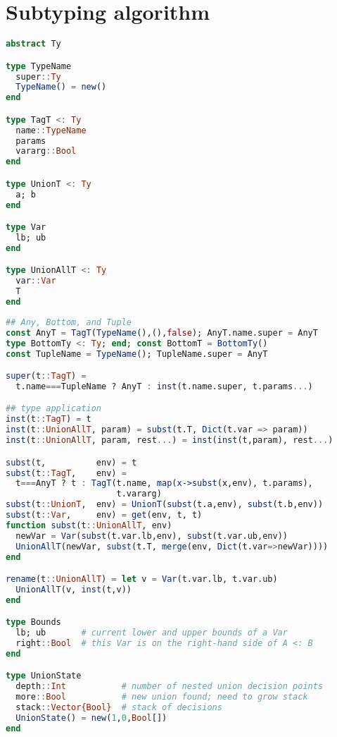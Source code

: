 \chapter{Subtyping algorithm}
\label{appendix:subtyping}

\begin{singlespace}
\begin{multicols}{2}
\begin{lstlisting}[language=julia]
abstract Ty

type TypeName
  super::Ty
  TypeName() = new()
end

type TagT <: Ty
  name::TypeName
  params
  vararg::Bool
end

type UnionT <: Ty
  a; b
end

type Var
  lb; ub
end

type UnionAllT <: Ty
  var::Var
  T
end
\end{lstlisting}
\end{multicols}

\vspace{-3ex}
\begin{lstlisting}[language=julia]
## Any, Bottom, and Tuple
const AnyT = TagT(TypeName(),(),false); AnyT.name.super = AnyT
type BottomTy <: Ty; end; const BottomT = BottomTy()
const TupleName = TypeName(); TupleName.super = AnyT

super(t::TagT) =
  t.name===TupleName ? AnyT : inst(t.name.super, t.params...)

## type application
inst(t::TagT) = t
inst(t::UnionAllT, param) = subst(t.T, Dict(t.var => param))
inst(t::UnionAllT, param, rest...) = inst(inst(t,param), rest...)

subst(t,          env) = t
subst(t::TagT,    env) =
  t===AnyT ? t : TagT(t.name, map(x->subst(x,env), t.params),
                      t.vararg)
subst(t::UnionT,  env) = UnionT(subst(t.a,env), subst(t.b,env))
subst(t::Var,     env) = get(env, t, t)
function subst(t::UnionAllT, env)
  newVar = Var(subst(t.var.lb,env), subst(t.var.ub,env))
  UnionAllT(newVar, subst(t.T, merge(env, Dict(t.var=>newVar))))
end

rename(t::UnionAllT) = let v = Var(t.var.lb, t.var.ub)
  UnionAllT(v, inst(t,v))
end

type Bounds
  lb; ub       # current lower and upper bounds of a Var
  right::Bool  # this Var is on the right-hand side of A <: B
end

type UnionState
  depth::Int           # number of nested union decision points
  more::Bool           # new union found; need to grow stack
  stack::Vector{Bool}  # stack of decisions
  UnionState() = new(1,0,Bool[])
end


\end{lstlisting}
\end{singlespace}
